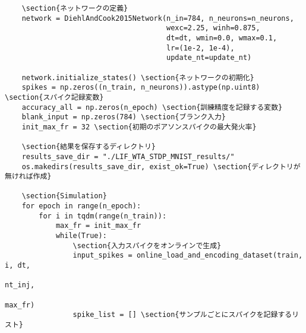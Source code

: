 \begin{verbatim}
    \section{ネットワークの定義}
    network = DiehlAndCook2015Network(n_in=784, n_neurons=n_neurons,
                                      wexc=2.25, winh=0.875,
                                      dt=dt, wmin=0.0, wmax=0.1,
                                      lr=(1e-2, 1e-4),
                                      update_nt=update_nt)
    
    network.initialize_states() \section{ネットワークの初期化}
    spikes = np.zeros((n_train, n_neurons)).astype(np.uint8) \section{スパイク記録変数}
    accuracy_all = np.zeros(n_epoch) \section{訓練精度を記録する変数}
    blank_input = np.zeros(784) \section{ブランク入力}
    init_max_fr = 32 \section{初期のポアソンスパイクの最大発火率}
    
    \section{結果を保存するディレクトリ}
    results_save_dir = "./LIF_WTA_STDP_MNIST_results/"
    os.makedirs(results_save_dir, exist_ok=True) \section{ディレクトリが無ければ作成}
    
    \section{Simulation}
    for epoch in range(n_epoch):
        for i in tqdm(range(n_train)):
            max_fr = init_max_fr
            while(True):
                \section{入力スパイクをオンラインで生成}
                input_spikes = online_load_and_encoding_dataset(train, i, dt,
                                                                nt_inj,
                                                                max_fr)
                spike_list = [] \section{サンプルごとにスパイクを記録するリスト}

\end{verbatim}
